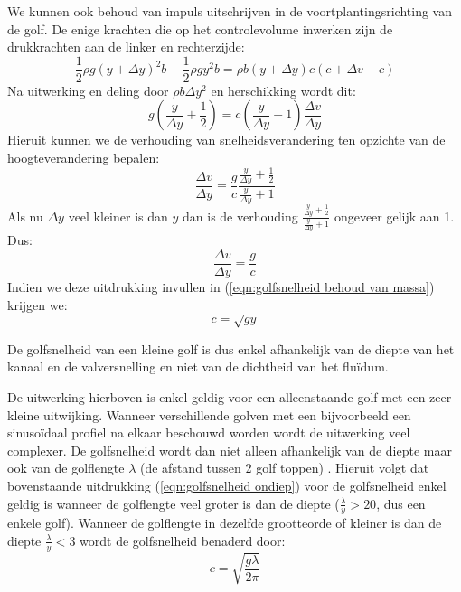 We kunnen ook behoud van impuls uitschrijven in de voortplantingsrichting van de golf. De enige krachten die op het controlevolume inwerken zijn de drukkrachten aan de linker en rechterzijde:
\begin{equation}
	\frac{1}{2}\rho g (y+\Delta y)^2 b - \frac{1}{2}\rho g y^2 b = \rho b (y+\Delta y) c (c+\Delta v-c)
\end{equation}
Na uitwerking en deling door $\rho b \Delta y^2$ en herschikking wordt dit:
\begin{equation}
	 g \left(\frac{y}{\Delta y} + \frac{1}{2}\right)  = c \left(\frac{y}{\Delta y} + 1\right)\frac{\Delta v}{\Delta y}
\end{equation}
Hieruit kunnen we de verhouding van snelheidsverandering ten opzichte van de hoogteverandering bepalen:
\begin{equation}
	\frac{\Delta v}{\Delta y} = \frac{g}{c} \frac{\frac{y}{\Delta y} + \frac{1}{2}}{\frac{y}{\Delta y} + 1}
\end{equation}
Als nu $\Delta y$ veel kleiner is dan $y$ dan is de verhouding $\frac{\frac{y}{\Delta y} + \frac{1}{2}}{\frac{y}{\Delta y} + 1}$ ongeveer gelijk aan 1. Dus:
\begin{equation}
	\frac{\Delta v}{\Delta y} = \frac{g}{c}
\end{equation}
Indien we deze uitdrukking invullen in (\ref{eqn:golfsnelheid behoud van massa}) krijgen we:
\begin{equation}
	c = \sqrt{g y}
	\label{eqn:golfsnelheid ondiep}
\end{equation}

De golfsnelheid van een kleine golf is dus enkel afhankelijk van de diepte van het kanaal en de valversnelling en niet van de dichtheid van het fluïdum.

De uitwerking hierboven is enkel geldig voor een alleenstaande golf met een zeer kleine uitwijking. Wanneer verschillende golven met een bijvoorbeeld een sinusoïdaal profiel na elkaar beschouwd worden wordt de uitwerking veel complexer. De golfsnelheid wordt dan niet alleen afhankelijk van de diepte maar ook van de golflengte $\lambda$ (de afstand tussen 2 golf toppen) \cite{Henderson1966}. Hieruit volgt dat bovenstaande uitdrukking (\ref{eqn:golfsnelheid ondiep}) voor de golfsnelheid enkel geldig is wanneer de golflengte veel groter is dan de diepte ($\frac{\lambda}{y} > 20$, dus een enkele golf). Wanneer de golflengte in dezelfde grootteorde of kleiner is dan de diepte $\frac{\lambda}{y} < 3$ wordt de golfsnelheid benaderd door:
\begin{equation}
	c = \sqrt{\frac{g \lambda}{2\pi}}
	\label{eqn:golfsnelheid diep}
\end{equation}

